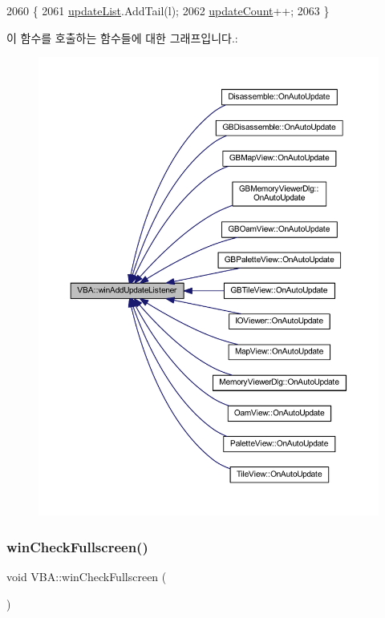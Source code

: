 \begin{DoxyCode}
2060 \{
2061   \mbox{\hyperlink{class_v_b_a_ad1bea05b3d5cd2fe5c3ea3c98db33ddc}{updateList}}.AddTail(l);
2062   \mbox{\hyperlink{class_v_b_a_a61d96a23607a428ad97f74f4b750fcc2}{updateCount}}++;
2063 \}
\end{DoxyCode}
이 함수를 호출하는 함수들에 대한 그래프입니다.\+:
\nopagebreak
\begin{figure}[H]
\begin{center}
\leavevmode
\includegraphics[width=350pt]{class_v_b_a_af0712f70a90d023ab8327a366be08174_icgraph}
\end{center}
\end{figure}
\mbox{\label{class_v_b_a_a340eaeeb7fcfc242f08ac3442d991a96}} 
\subsubsection{\texorpdfstring{win\+Check\+Fullscreen()}{winCheckFullscreen()}}
{\footnotesize\ttfamily void V\+B\+A\+::win\+Check\+Fullscreen (\begin{DoxyParamCaption}{ }\end{DoxyParamCaption})}



